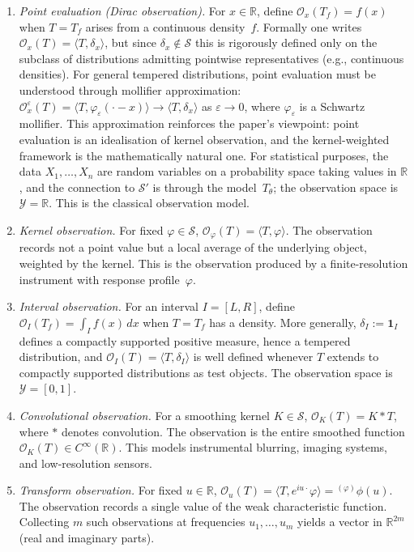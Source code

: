 \documentclass[11pt,a4paper]{article}
\newcommand{\R}{\mathbb{R}}
\newcommand{\eg}{{e.g.}, }
\begin{document}
\begin{enumerate}[label=(\roman*)]
\item \emph{Point evaluation (Dirac observation).}
For $x \in \R$, define $\mathcal O_x(T_f) = f(x)$ when $T = T_f$ arises
from a continuous density~$f$.  Formally one writes
$\mathcal O_x(T) = \langle T, \delta_x \rangle$, but since
$\delta_x \notin \mathcal S$ this is rigorously defined only on the
subclass of distributions admitting pointwise representatives (\eg
continuous densities).  For general tempered distributions, point evaluation
must be understood through mollifier approximation:
$\mathcal O_x^\varepsilon(T) = \langle T, \varphi_\varepsilon(\cdot - x)
\rangle \to \langle T, \delta_x \rangle$ as $\varepsilon \to 0$, where
$\varphi_\varepsilon$ is a Schwartz mollifier.  This approximation
reinforces the paper's viewpoint: point evaluation is an idealisation of
kernel observation, and the kernel-weighted framework is the mathematically
natural one.
For statistical purposes, the data $X_1, \ldots, X_n$ are random variables
on a probability space taking values in $\R$, and the connection to
$\mathcal S'$ is through the model~$T_\theta$; the observation space is
$\mathcal Y = \R$.  This is the classical observation model.

\item \emph{Kernel observation.}
For fixed $\varphi \in \mathcal S$,
$\mathcal O_\varphi(T) = \langle T, \varphi \rangle$.  The observation
records not a point value but a local average of the underlying object,
weighted by the kernel.  This is the observation produced by a
finite-resolution instrument with response profile~$\varphi$.

\item \emph{Interval observation.}
For an interval $I = [L, R]$, define
$\mathcal O_I(T_f) = \int_I f(x)\,dx$ when $T = T_f$ has a density.
More generally, $\delta_I := \mathbf{1}_I$ defines a compactly supported
positive measure, hence a tempered distribution, and
$\mathcal O_I(T) = \langle T, \delta_I \rangle$ is well defined whenever
$T$ extends to compactly supported distributions as test objects.  The
observation space is $\mathcal Y = [0,1]$.

\item \emph{Convolutional observation.}
For a smoothing kernel $K \in \mathcal S$,
$\mathcal O_K(T) = K * T$, where $*$ denotes convolution.  The
observation is the entire smoothed function
$\mathcal O_K(T) \in C^\infty(\R)$.  This models instrumental blurring,
imaging systems, and low-resolution sensors.

\item \emph{Transform observation.}
For fixed $u \in \R$,
$\mathcal O_u(T) = \langle T, e^{iu\cdot}\varphi \rangle
= {}^{(\varphi)}\phi(u)$.  The observation records a single value of the
weak characteristic function.  Collecting $m$ such observations at
frequencies $u_1, \ldots, u_m$ yields a vector in $\R^{2m}$ (real and
imaginary parts).
\end{enumerate}
\end{document}
